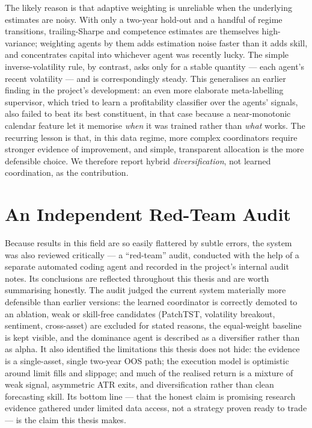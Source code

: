 The likely reason is that adaptive weighting is unreliable when the underlying estimates are noisy. With only a two-year hold-out and a handful of regime transitions, trailing-Sharpe and competence estimates are themselves high-variance; weighting agents by them adds estimation noise faster than it adds skill, and concentrates capital into whichever agent was recently lucky. The simple inverse-volatility rule, by contrast, asks only for a stable quantity --- each agent's recent volatility --- and is correspondingly steady. This generalises an earlier finding in the project's development: an even more elaborate meta-labelling supervisor, which tried to learn a profitability classifier over the agents' signals, also failed to beat its best constituent, in that case because a near-monotonic calendar feature let it memorise \textit{when} it was trained rather than \textit{what} works. The recurring lesson is that, in this data regime, more complex coordinators require stronger evidence of improvement, and simple, transparent allocation is the more defensible choice. We therefore report hybrid \textit{diversification}, not learned coordination, as the contribution.

\section{An Independent Red-Team Audit}
\label{sec:redteam}

Because results in this field are so easily flattered by subtle errors, the system was also reviewed critically --- a ``red-team'' audit, conducted with the help of a separate automated coding agent and recorded in the project's internal audit notes. Its conclusions are reflected throughout this thesis and are worth summarising honestly. The audit judged the current system materially more defensible than earlier versions: the learned coordinator is correctly demoted to an ablation, weak or skill-free candidates (PatchTST, volatility breakout, sentiment, cross-asset) are excluded for stated reasons, the equal-weight baseline is kept visible, and the dominance agent is described as a diversifier rather than as alpha. It also identified the limitations this thesis does not hide: the evidence is a single-asset, single two-year OOS path; the execution model is optimistic around limit fills and slippage; and much of the realised return is a mixture of weak signal, asymmetric ATR exits, and diversification rather than clean forecasting skill. Its bottom line --- that the honest claim is promising research evidence gathered under limited data access, not a strategy proven ready to trade --- is the claim this thesis makes.

